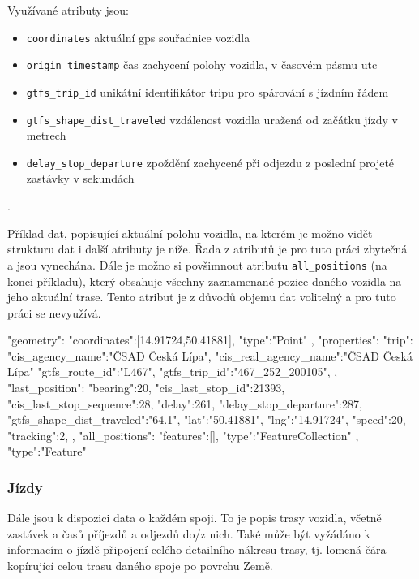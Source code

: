 \bigbreak

Využívané atributy jsou:

\begin{itemize}
	\item \verb-coordinates- aktuální \gls{gps} souřadnice vozidla

	\item \verb-origin_timestamp- čas zachycení polohy vozidla, v časovém pásmu \gls{utc}

	\item \verb-gtfs_trip_id- unikátní identifikátor tripu pro spárování s jízdním řádem

	\item \verb-gtfs_shape_dist_traveled- vzdálenost vozidla uražená od začátku jízdy v metrech

	\item \verb-delay_stop_departure- zpoždění zachycené při odjezdu z poslední projeté zastávky v sekundách
\end{itemize}.

Příklad dat, popisující aktuální polohu vozidla, na kterém je možno vidět strukturu dat i další atributy je níže. Řada z atributů je pro tuto práci zbytečná a jsou vynechána. Dále je možno si povšimnout atributu \verb-all_positions- (na konci příkladu), který obsahuje všechny zaznamenané pozice daného vozidla na jeho aktuální trase. Tento atribut je z důvodů objemu dat volitelný a pro tuto práci se nevyužívá.

\begin{code}[frame=none]
"geometry":{
  "coordinates":[14.91724,50.41881],
  "type":"Point"
},
"properties":{
  "trip":{
    "cis_agency_name":"ČSAD Česká Lípa",
	"cis_real_agency_name":"ČSAD Česká Lípa"
	"gtfs_route_id":"L467",
	"gtfs_trip_id":"467_252_200105",
  },
  "last_position":{
    "bearing":20,
	"cis_last_stop_id":21393,
	"cis_last_stop_sequence":28,
	"delay":261,
	"delay_stop_departure":287,
	"gtfs_shape_dist_traveled":"64.1",
	"lat":"50.41881",
	"lng":"14.91724",
	"speed":20,
	"tracking":2,
	},
  "all_positions":{
    "features":[],
	"type":"FeatureCollection"
  }
},
"type":"Feature"

\end{code}

\subsubsection{Jízdy}

Dále jsou k dispozici data o každém spoji. To je popis trasy vozidla, včetně zastávek a časů příjezdů a odjezdů do/z nich. Také může být vyžádáno k informacím o jízdě připojení celého detailního nákresu trasy, tj. lomená čára kopírující celou trasu daného spoje po povrchu Země.

